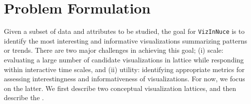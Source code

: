 
\section{Problem Formulation} 
 
Given a subset of data and attributes to be studied, the goal for {\tt VizInNuce} is to  identify the most interesting and informative visualizations summarizing patterns or trends. There are two major challenges in achieving this goal; (i) scale: evaluating a large number of candidate visualizations in lattice while responding within interactive time scales, and (ii) utility: identifying appropriate metrics for assessing interestingness and informativeness of visualizations. For now, we focus on the latter. We first describe two conceptual visualization lattices, and then describe the .

 
 
